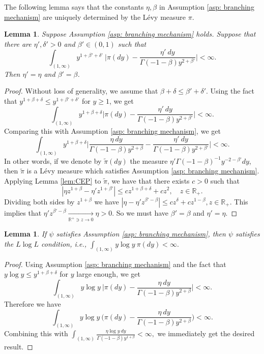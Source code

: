 \documentclass[12pt,a4paper]{amsart}
\theoremstyle{plain}
\newtheorem{lem}[thm]{Lemma}
\theoremstyle{definition}
\numberwithin{equation}{section}
\begin{document}
The following lemma says that the constants $\eta, \beta$ in Assumption \ref{asp: branching mechanism} are uniquely determined by the L\'evy measure $\pi$.
\begin{lem}
  \label{lem: unique of beta and eta}
  Suppose Assumption  \ref{asp: branching mechanism} holds. Suppose that there are $\eta', \delta'>0$ and $\beta'\in (0,1)$ such that
  \[
    \int_{(1,\infty)} y^{ 1 + \beta'  + \delta' }~ \Big| \pi(dy) - \frac {\eta' ~dy} {\Gamma (- 1 - \beta ) y^{2 + \beta'}} \Big|
    < \infty.
  \]
	Then $\eta'= \eta$ and $\beta ' = \beta$.
\end{lem}
\begin{proof}
	Without loss of generality, we assume that $\beta+\delta \leq \beta'+ \delta'$.
	Using  the fact that $y^{1+\beta+ \delta} \leq y^{1+\beta'+\delta'}$ for $y \geq 1$, we get
  \[
    \int_{(1, \infty)} y^{1 + \beta + \delta}   \Big| \pi(dy) - \frac {\eta' ~dy} {\Gamma( - 1 - \beta)y^{2 + \beta'}} \Big|
    < \infty .
  \]
	Comparing this with Assumption \ref{asp: branching mechanism}, we get
  \[
    \int_{(1,\infty)} y^{ 1 + \beta + \delta} \Big| \frac { \eta ~dy} {\Gamma (- 1 - \beta) y^{2 + \beta}} - \frac {\eta' ~dy} {\Gamma (- 1 - \beta) y^{2 + \beta'}} \Big| < \infty.
  \]
	In other words, if we denote by $\widetilde \pi(dy)$ the measure $\eta' \Gamma(-1-\beta)^{-1} y^{-2-\beta'} dy$, then $\widetilde \pi$ is a L\'evy measure which satisfies Assumption \ref{asp: branching mechanism}.
	Applying Lemma \ref{lem:CEP} to $\widetilde \pi$, we have that there exists $c>0$ such that
  \[
    | \eta z^{ 1 + \beta } - \eta' z^{ 1 + \beta' } |
    \leq c z^{ 1 + \beta + \delta } + c z^2
    , \quad z \in \mathbb R_+.
  \]
  Dividing both sides by $z^{1+\beta}$ we have
   $
   | \eta - \eta' z^{ \beta' - \beta } |
    \leq cz^{\delta}+cz^{1-\beta}
    ,	z \in \mathbb R_+.
 $
	This implies that $ \eta' z^{\beta' - \beta} \xrightarrow[\mathbb R^+\ni z\to 0]{} \eta >0. $
	So we must have $\beta'= \beta$ and $\eta'= \eta$.
\end{proof}
\begin{lem}
  \label{lem: LlogL criterion}
  If $\psi$ satisfies Assumption  \ref{asp: branching mechanism}, then $\psi$ satisfies the $L \log L$ condition, i.e.,
   $
    \int_{(1,\infty)} y \log y~\pi(dy)
    < \infty.
 $
\end{lem}
\begin{proof}
	Using  Assumption \ref{asp: branching mechanism} and the fact that $y\log y \leq y^{1+\beta+\delta}$ for $y$ large enough, we get
  \[
    \int_{(1,\infty)} y \log y ~\Big| \pi(dy) - \frac { \eta ~dy } { \Gamma ( - 1 - \beta ) y^{ 2 + \beta } } \Big|
    < \infty.
  \]
	Therefore we have
  \[
    \int_{ ( 1, \infty ) } y \log y ~\Big( \pi(dy) - \frac { \eta ~dy } { \Gamma ( - 1 - \beta ) y^{ 2 + \beta } } \Big)
    < \infty.
  \]
  Combining this with
  $
  \int_{ ( 1, \infty ) } \frac { \eta \log y ~dy } { \Gamma ( - 1 - \beta ) y^{ 1 + \beta } }
    < \infty,
 $
  we immediately get the desired result.
\end{proof}
\end{document}
